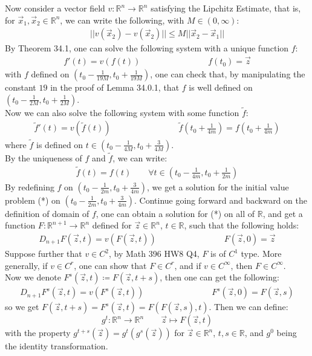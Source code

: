 \documentclass[15pt]{book}
\theoremstyle{break}
\theoremstyle{break}
\newcommand{\R}{\mathbb{R}}
\newcommand{\that}[1]{\widetilde{#1}}
\begin{document}
Now consider a vector field $v:\R^n \to \R^n$ satisfying the Lipchitz Estimate, that is, for $\vec{x}_1,\vec{x}_2 \in \R^n$, we can write the following, with $M\in (0,\infty)$:
\begin{align*}
||v(\vec{x}_2) - v(\vec{x}_2)|| \leq M ||\vec{x}_2-\vec{x}_1|| 
\end{align*}
By Theorem 34.1, one can solve the following system with a unique function $f$:
\begin{align*}
f'(t) = v(f(t)) \qquad\qquad\qquad\qquad f(t_0) = \vec{z} \tag{*}
\end{align*}  
with $f$ defined on $(t_0 - \frac{1}{19M}, t_0 + \frac{1}{19M})$, one can check that, by manipulating the constant $19$ in the proof of Lemma 34.0.1, that $f$ is well defined on $(t_0 - \frac{1}{2M}, t_0 + \frac{1}{2M})$. \\
Now we can also solve the following system with some function $\that{f}$:
\begin{align*}
\that{f}'(t) = v(\that{f}(t)) \qquad\qquad\qquad\qquad \that{f}\left(t_0 + \frac{1}{4m}\right) = f\left(t_0 + \frac{1}{4m}\right)
\end{align*}
where $\that{f}$ is defined on $t \in (t_0 - \frac{1}{4M}, t_0+\frac{3}{4M})$. \\
By the uniqueness of $f$ and $\that{f}$, we can write:
\begin{align*}
\that{f}(t) = f(t) \qquad \forall t\in\left(t_0 - \frac{1}{4m}, t_0 + \frac{1}{2m}\right)
\end{align*}
By redefining $f$ on $(t_0 - \frac{1}{2m}, t_0+\frac{3}{4m})$, we get a solution for the initial value problem (*) on $(t_0 - \frac{1}{2m}, t_0+\frac{3}{4m})$. Continue going forward and backward on the definition of domain of $f$, one can obtain a solution for (*) on all of $\R$, and get a function $F:\R^{n+1} \to \R^n$ defined for $\vec{z}\in \R^n$, $t \in \R$, such that the following holds:
\begin{align*}
D_{n+1}F(\vec{z},t) = v(F(\vec{z},t))
\qquad\qquad\qquad\qquad
F(\vec{z},0) = \vec{z}
\end{align*}
Suppose further that $v\in C^2$, by Math 396 HW8 Q4, $F$ is of $C^1$ type. More generally, if $v\in C^{r}$, one can show that $F \in C^{r}$, and if $v \in C^\infty$, then $F \in C^\infty$. \\

Now we denote $F^s(\vec{z},t) \coloneqq F(\vec{z}, t+s)$, then one can get the following:
\begin{align*}
D_{n+1} F^s(\vec{z},t) = v(F^s(\vec{z},t)) \qquad\qquad\qquad\qquad F^s(\vec{z},0) = F(\vec{z},s)
\end{align*}
so we get $F(\vec{z},t+s) = F^s(\vec{z},t) = F(F(\vec{z},s),t)$. Then we can define:
$$g^t:\R^n \to \R^n \qquad \vec{z}\mapsto F(\vec{z},t)$$ 
with the property $g^{t+s}(\vec{z}) = g^t(g^s(\vec{z}))$ for $\vec{z}\in \R^n$, $t,s \in \R$, and $g^0$ being the identity transformation. \\
\end{document}
